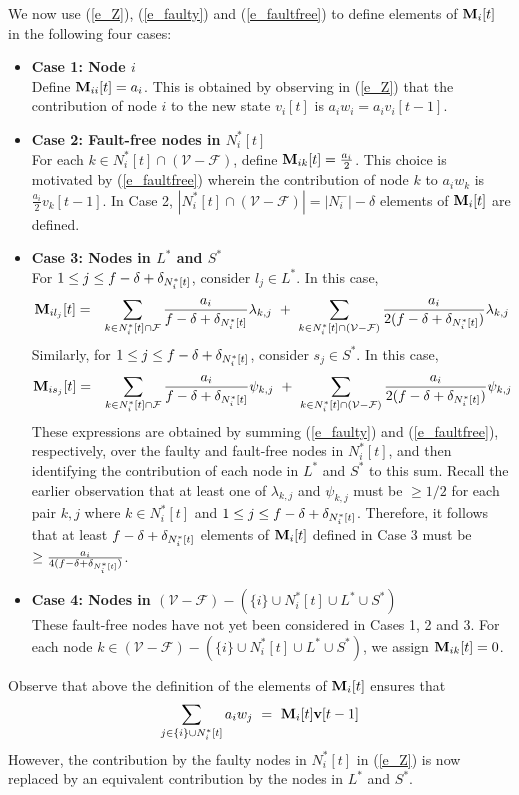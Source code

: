 \documentclass[letterpaper, 12pt]{article}
\newcommand{\scriptf}{\mathcal{F}}
\newcommand{\scriptv}{\mathcal{V}}
\begin{document}
We now use (\ref{e_Z}), (\ref{e_faulty}) and (\ref{e_faultfree}) to define elements
of ${\bf M}_i[t]$ in the following four cases:
\begin{itemize}
\item {\bf Case 1: Node $i$}\\ Define ${\bf M}_{ii}[t]=a_i$. This is obtained by observing in (\ref{e_Z}) that
the contribution of node $i$ to the new state $v_i[t]$ is $a_iw_i=a_iv_i[t-1]$.
\item {\bf Case 2: Fault-free nodes in $N_i^*[t]$}\\
For each $k\in N_i^*[t]\cap (\scriptv-\scriptf)$,
define ${\bf M}_{ik}[t] = \frac{a_i}{2}$. This choice is motivated by (\ref{e_faultfree})
wherein the contribution of node $k$ to $a_iw_k$ is $\frac{a_i}{2}v_k[t-1]$.
In Case 2, $|N_i^*[t]\cap(\scriptv-\scriptf)|=|N_i^-|-\delta$ elements
of ${\bf M}_i[t]$ are defined.
\item {\bf Case 3: Nodes in $L^*$ and $S^*$}\\ For $1\leq j\leq f-\delta+\delta_{N_i^*[t]}$, consider $l_j\in L^*$. In this
case, 
\begin{eqnarray*}
\bfM_{il_j}[t] &=&
\sum_{k\in N_i^*[t] \cap \scriptf} \frac{a_i}{f-\delta+\deltaC} \lambda_{k,j}
~+~
\sum_{k\in N_i^*[t]\cap (\scriptv-\scriptf)}
\frac{a_i}{2(f-\delta+\deltaC)} \lambda_{k,j}
\end{eqnarray*}
Similarly, for $1\leq j\leq f-\delta+\delta_{N_i^*[t]}$, consider $s_j\in S^*$. In this
case, 
\begin{eqnarray*}
\bfM_{is_j}[t] &=&
\sum_{k\in N_i^*[t] \cap \scriptf} \frac{a_i}{f-\delta+\deltaC} \psi_{k,j}
~+~
\sum_{k\in N_i^*[t]\cap (\scriptv-\scriptf)}
\frac{a_i}{2(f-\delta+\deltaC)} \psi_{k,j}
\end{eqnarray*}
These expressions are obtained by summing (\ref{e_faulty})
and (\ref{e_faultfree}), respectively, over the faulty and fault-free nodes
in $N_i^*[t]$, and then identifying the contribution
of each node in $L^*$ and $S^*$ to this sum.
Recall the earlier observation that at least one of $\lambda_{k,j}$
and $\psi_{k,j}$ must be $\geq 1/2$ for each pair $k,j$ where $k\in N_i^*[t]$
and $1 \leq j\leq f-\delta+\delta_{N_i^*[t]}$.
Therefore, it follows that
at least $f-\delta+\delta_{N_i^*[t]}$ elements of ${\bf M}_i[t]$ defined
in Case 3 must be $\geq \frac{a_i}{4(f-\delta+\delta_{N_i^*[t]})}$.

\item {\bf Case 4: Nodes in $(\scriptv-\scriptf)-(\{i\}\cup N_i^*[t]\cup L^*\cup S^*)$}\\
These fault-free nodes have not yet been considered in Cases 1, 2 and 3.
For each node $k\in (\scriptv-\scriptf)-(\{i\}\cup N_i^*[t]\cup L^*\cup S^*)$,
we assign ${\bf M}_{ik}[t]=0$. 
\end{itemize}
Observe that above the definition of the elements of ${\bf M}_i[t]$
ensures that 
\[ \sum_{j\in\{i\}\cup N_i^*[t]}a_iw_j~=~{\bf M}_i[t]{\bf v}[t-1]\]
However, the contribution by the
faulty nodes in $N_i^*[t]$ in (\ref{e_Z}) is
now replaced by an
equivalent contribution by the nodes in $L^*$ and $S^*$.
\end{document}
